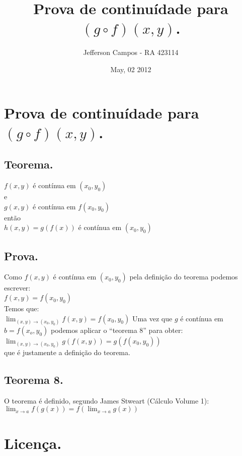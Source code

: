 \documentclass[a4paper,12pt]{article}
\title{ Prova de continuídade para $(g \circ f)(x,y)$.}
\author{Jefferson Campos - RA 423114}
\date{May, 02 2012}
\begin{document}


\section{Prova de continuídade para $(g \circ f)(x,y)$.}

\subsection{Teorema.}
$f(x,y)$ é contínua em $(x_0,y_0)$\\
e\\
$g(x,y)$ é contínua em $f(x_0,y_0)$\\
então\\
$h(x,y) = g(f(x))$ é contínua em $(x_0,y_0)$\\


\subsection{Prova.}

Como $f(x,y)$ é contínua em $(x_0,y_0)$ pela definição do teorema podemos escrever:\\
$f(x,y) = f(x_0,y_0)$\\
Temos que:\\
$\lim_{(x,y)\to (x_0,y_0)}{f(x,y)} = f(x_0,y_0)$
Uma vez que $g$ é contínua em $b = f(x_o,y_0)$ podemos aplicar o ``teorema 8'' para obter:\\
$\lim_{(x,y)\to (x_0,y_0)}{g(f(x,y))} = g(f(x_0,y_0))$\\
que é justamente a definição do teorema.

\subsection{Teorema 8.}

O teorema é definido, segundo James Stweart (Cálculo Volume 1):\\

$\lim_{x \to a}{f(g(x))} = f(\lim_{x\to a}{g(x)})$\\

\section{Licença.}
\end{document}
